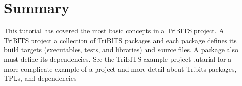 \documentclass[12pt]{article}
\begin{document}
\section{Summary}
This tutorial has covered the most basic concepts in a TriBITS
project. A TriBITS project a collection of TriBITS packages and each
package defines its build targets (executables, tests, and libraries)
and source files.  A package also must define its dependencies. See
the TriBITS example project tutarial for a more complicate example of
a project and more detail about Tribits packages, TPLs, and
dependencies


\end{document}
